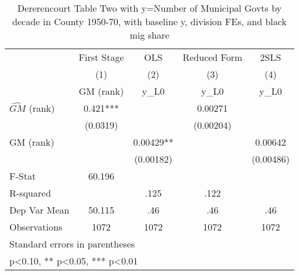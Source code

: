 \begin{table}[htbp]\centering
\def\sym#1{\ifmmode^{#1}\else\(^{#1}\)\fi}
\caption{Dererencourt Table Two with y=Number of Municipal Govts by decade in County 1950-70, with baseline y, division FEs, and black mig share}
\begin{tabular}{l*{4}{c}}
\toprule
                    & First Stage   &         OLS   &Reduced Form   &        2SLS   \\
                    &\multicolumn{1}{c}{(1)}&\multicolumn{1}{c}{(2)}&\multicolumn{1}{c}{(3)}&\multicolumn{1}{c}{(4)}\\
                    &\multicolumn{1}{c}{GM  (rank)}&\multicolumn{1}{c}{y\_L0}&\multicolumn{1}{c}{y\_L0}&\multicolumn{1}{c}{y\_L0}\\
\midrule
$\hat{GM}$ (rank)   &       0.421***&               &     0.00271   &               \\
                    &    (0.0319)   &               &   (0.00204)   &               \\
\addlinespace
GM  (rank)          &               &     0.00429** &               &     0.00642   \\
                    &               &   (0.00182)   &               &   (0.00486)   \\
\midrule
F-Stat              &      60.196   &               &               &               \\
R-squared           &               &        .125   &        .122   &               \\
Dep Var Mean        &      50.115   &         .46   &         .46   &         .46   \\
Observations        &        1072   &        1072   &        1072   &        1072   \\
\bottomrule
\multicolumn{5}{l}{\footnotesize Standard errors in parentheses}\\
\multicolumn{5}{l}{\footnotesize * p<0.10, ** p<0.05, *** p<0.01}\\
\end{tabular}
\end{table}
